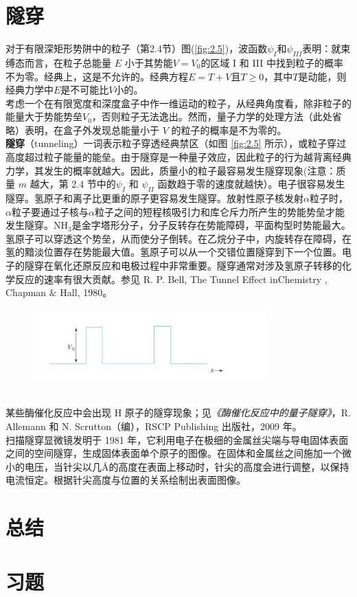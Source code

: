 \section{隧穿}
	对于有限深矩形势阱中的粒子（第2.4节）图(\ref{fig:2.5})，波函数$\psi_I$和$\psi_{III}$表明：就束缚态而言，在粒子总能量 $E$ 小于其势能$V=V_0$的区域 I 和 III 中找到粒子的概率不为零。经典上，这是不允许的。经典方程$E=T+V$且$T \ge 0$，其中$T$是动能，则经典力学中$E$是不可能比$V$小的。\\
	\indent 考虑一个在有限宽度和深度盒子中作一维运动的粒子，从经典角度看，除非粒子的能量大于势能势垒$V_0$，否则粒子无法逸出。然而，量子力学的处理方法（此处省略）表明，在盒子外发现总能量小于 $V$ 的粒子的概率是不为零的。\\
	\indent \textbf{隧穿}（tunneling）一词表示粒子穿透经典禁区（如图 \ref{fig:2.5} 所示），或粒子穿过高度超过粒子能量的能垒。由于隧穿是一种量子效应，因此粒子的行为越背离经典力学，其发生的概率就越大。因此，质量小的粒子最容易发生隧穿现象(注意：质量 $m$ 越大，第 2.4 节中的$\psi_I$ 和 $\psi_{II}$ 函数趋于零的速度就越快）。电子很容易发生隧穿。氢原子和离子比更重的原子更容易发生隧穿。放射性原子核发射$\alpha$粒子时，$\alpha$粒子要通过子核与$\alpha$粒子之间的短程核吸引力和库仑斥力所产生的势能势垒才能发生隧穿。$\mathrm{NH_3}$是金字塔形分子，分子反转存在势能障碍，平面构型时势能最大。氢原子可以穿透这个势垒，从而使分子倒转。在乙烷分子中，内旋转存在障碍，在氢的黯淡位置存在势能最大值。氢原子可以从一个交错位置隧穿到下一个位置。电子的隧穿在氧化还原反应和电极过程中非常重要。隧穿通常对涉及氢原子转移的化学反应的速率有很大贡献。参见 R. P. Bell, The Tunnel Effect inChemistry , Chapman $\&$ Hall, 1980。
		\begin{figure}[h!]
		\centering
		\includegraphics[width=0.8\textwidth]{Figures/2.6.png}  %
		\caption{}
		\label{fig:2.6}
	\end{figure}
	\\
	\indent 某些酶催化反应中会出现 H 原子的隧穿现象；见\textit{《酶催化反应中的量子隧穿》}，R. Allemann 和 N. Scrutton（编），RSCP Publishing 出版社，2009 年。\\
	\indent  扫描隧穿显微镜发明于 1981 年，它利用电子在极细的金属丝尖端与导电固体表面之间的空间隧穿，生成固体表面单个原子的图像。在固体和金属丝之间施加一个微小的电压，当针尖以几\AA 的高度在表面上移动时，针尖的高度会进行调整，以保持电流恒定。根据针尖高度与位置的关系绘制出表面图像。
	
	
	
	
	
	
	

\section*{总结}

\section*{习题}
